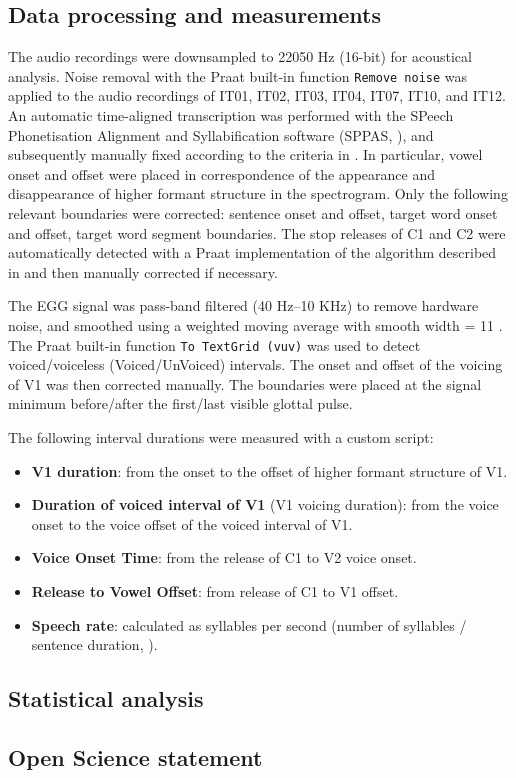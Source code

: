 \documentclass[12pt,]{article}
\providecommand{\tightlist}{%
  \setlength{\itemsep}{0pt}\setlength{\parskip}{0pt}}
\begin{document}
\hypertarget{data-processing-and-measurements}{%
\subsection{Data processing and
measurements}\label{data-processing-and-measurements}}

The audio recordings were downsampled to 22050 Hz (16-bit) for
acoustical analysis. Noise removal with the Praat built-in function
\texttt{Remove\ noise} \citep{boersma2018} was applied to the audio
recordings of IT01, IT02, IT03, IT04, IT07, IT10, and IT12. An automatic
time-aligned transcription was performed with the SPeech Phonetisation
Alignment and Syllabification software (SPPAS, \citealt{bigi2015}), and
subsequently manually fixed according to the criteria in
\citet{machac2009}. In particular, vowel onset and offset were placed in
correspondence of the appearance and disappearance of higher formant
structure in the spectrogram. Only the following relevant boundaries
were corrected: sentence onset and offset, target word onset and offset,
target word segment boundaries. The stop releases of C1 and C2 were
automatically detected with a Praat implementation of the algorithm
described in \citet{ananthapadmanabha2014} and then manually corrected
if necessary.

The EGG signal was pass-band filtered (40 Hz--10 KHz) to remove hardware
noise, and smoothed using a weighted moving average with smooth width =
11 \citep{macerata2016}. The Praat built-in function
\texttt{To\ TextGrid\ (vuv)} was used to detect voiced/voiceless
(Voiced/UnVoiced) intervals. The onset and offset of the voicing of V1
was then corrected manually. The boundaries were placed at the signal
minimum before/after the first/last visible glottal pulse.

The following interval durations were measured with a custom script:

\begin{itemize}
\tightlist
\item
  \textbf{V1 duration}: from the onset to the offset of higher formant
  structure of V1.
\item
  \textbf{Duration of voiced interval of V1} (V1 voicing duration): from
  the voice onset to the voice offset of the voiced interval of V1.
\item
  \textbf{Voice Onset Time}: from the release of C1 to V2 voice onset.
\item
  \textbf{Release to Vowel Offset}: from release of C1 to V1 offset.
\item
  \textbf{Speech rate}: calculated as syllables per second (number of
  syllables / sentence duration, \citealt{plug2018a}).
\end{itemize}

\hypertarget{statistical-analysis}{%
\subsection{Statistical analysis}\label{statistical-analysis}}

\hypertarget{open-science-statement}{%
\subsection{Open Science statement}\label{open-science-statement}}


\end{document}
